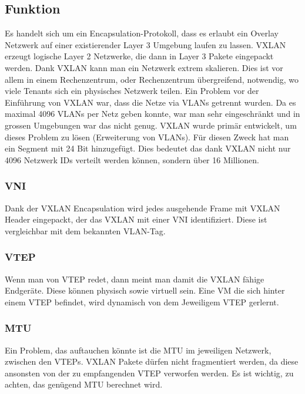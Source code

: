 \documentclass[a4,12pt]{scrartcl}
\begin{document}
\subsection{Funktion}
Es handelt sich um ein Encapsulation-Protokoll, dass es erlaubt ein Overlay Netzwerk auf einer existierender Layer 3 Umgebung laufen zu lassen. VXLAN erzeugt logische Layer 2 Netzwerke, die dann in Layer 3 Pakete eingepackt werden. Dank VXLAN kann man ein Netzwerk extrem skalieren. Dies ist vor allem in einem Rechenzentrum, oder Rechenzentrum übergreifend, notwendig, wo viele Tenants sich ein physisches Netzwerk teilen. Ein Problem vor der Einführung von VXLAN war, dass die Netze via VLANs getrennt wurden. Da es maximal 4096 VLANs per Netz geben konnte, war man sehr eingeschränkt und in grossen Umgebungen war das nicht genug. VXLAN wurde primär entwickelt, um dieses Problem zu lösen (Erweiterung von VLANs). Für diesen Zweck hat man ein Segment mit 24 Bit hinzugefügt. Dies bedeutet das dank VXLAN nicht nur 4096 Netzwerk IDs verteilt werden können, sondern über 16 Millionen. 

\subsubsection{VNI}
Dank der VXLAN Encapsulation wird jedes ausgehende Frame mit VXLAN Header eingepackt, der das VXLAN mit einer VNI identifiziert. Diese ist vergleichbar mit dem bekannten VLAN-Tag. 

\subsubsection{VTEP}
Wenn man von VTEP redet, dann meint man damit die VXLAN fähige Endgeräte. Diese können physisch sowie virtuell sein. Eine VM die sich hinter einem VTEP befindet, wird dynamisch von dem Jeweiligem VTEP gerlernt. 

\subsubsection{MTU}
Ein Problem, das auftauchen könnte ist die MTU im jeweiligen Netzwerk, zwischen den VTEPs. VXLAN Pakete dürfen nicht fragmentiert werden, da diese ansonsten von der zu empfangenden VTEP verworfen werden. Es ist wichtig, zu achten, das genügend MTU berechnet wird. 
\end{document}
